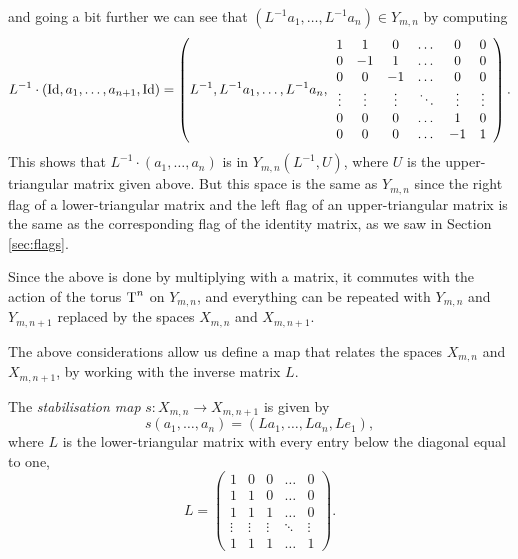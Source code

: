 and going a bit further we can see that
$(L^{-1}a_1,\dots,L^{-1}a_{n}) \in Y_{m,n}$ by computing
\[ L^{-1}\cdot \left(\operatorname{Id},a_1,\dots,a_{n+1},\operatorname{Id}\right) =
\left(L^{-1},L^{-1}a_1,\dots,L^{-1}a_{n},
  \begin{array}{cccccc}
    1 &  1 &  0 & \dots &  0 & 0 \\
    0 & -1 &  1 & \dots &  0 & 0 \\
    0 &  0 & -1 & \dots &  0 & 0 \\
    \vdots & \vdots & \vdots & \ddots & \vdots & \vdots \\
    0 &  0 & 0 & \dots &  1 & 0 \\
    0 &  0 & 0 & \dots & -1 & 1
  \end{array}
\right). \]
This shows that $L^{-1}\cdot(a_1,\dots,a_{n})$ is in
$Y_{m,n}(L^{-1},U)$, where $U$ is the
upper-triangular matrix given above. But this space is the same as
$Y_{m,n}$ since the right flag of a lower-triangular matrix and the
left flag of an upper-triangular matrix
is the same as the corresponding flag of the identity
matrix, as we saw in Section \ref{sec:flags}.

Since the above is done by multiplying with a matrix, it commutes with
the action of the torus $\operatorname{T}^n$ on $Y_{m,n}$, and everything can be
repeated with $Y_{m,n}$ and $Y_{m,n+1}$ replaced by the spaces
$X_{m,n}$ and $X_{m,n+1}$.

The above considerations allow us define a map that relates the spaces
$X_{m,n}$ and $X_{m,n+1}$, by working with the inverse matrix $L$.
\begin{definition}
  \label{def:stabilisering}
  The \textit{stabilisation map} $s : X_{m,n} \to X_{m,n+1}$ is given
  by
  \[ s\left(a_1,\dots,a_{n}\right) =
  \left(La_1,\dots,La_{n},Le_1\right), \]
  where $L$ is the lower-triangular matrix with every entry below the
  diagonal equal to one,
  \[ L =
  \begin{pmatrix}
    1 & 0 & 0 & \dots & 0 \\
    1 & 1 & 0 & \dots & 0 \\
    1 & 1 & 1 & \dots & 0 \\
    \vdots & \vdots & \vdots & \ddots & \vdots \\
    1 & 1 & 1 & \dots & 1
  \end{pmatrix}. \]
\end{definition}

